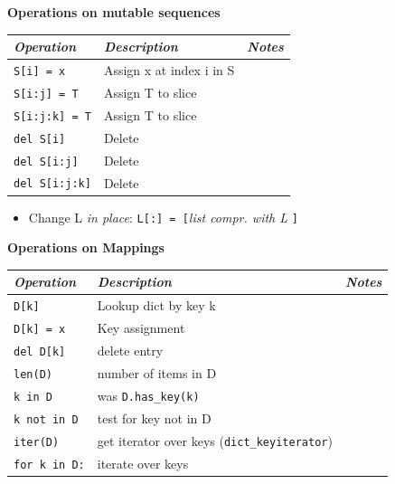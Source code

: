 \documentclass[9pt,a4wide]{extarticle}
\begin{document}
\bigskip
{\bf Operations on mutable sequences}

\begin{supertabular}{|l|p{12cm}|c|}\hline
{\em Operation }     &   {\em  Description}         & {\em  Notes} \\ \hline\hline

{\tt S[i] = x}       &   Assign x at index i in S   &        \\ \hline
{\tt S[i:j] = T}     &   Assign T to slice          &        \\ \hline
{\tt S[i:j:k] = T}   &   Assign T to slice          &        \\ \hline
{\tt del S[i]}       &   Delete                     &        \\ \hline
{\tt del S[i:j]}     &   Delete                     &        \\ \hline
{\tt del S[i:j:k]}   &   Delete                     &        \\ \hline
\end{supertabular}


\begin{itemize}
\item Change L {\em in place}: {\tt L[:] = [}{\em list compr. with L} {\tt ]}
\end{itemize}


\bigskip
{\bf Operations on Mappings}

\begin{supertabular}{|l|p{12cm}|c|}\hline
{\em Operation }     &   {\em  Description}         & {\em  Notes} \\ \hline\hline

{\tt D[k]}            &  Lookup dict by key k       &        \\ \hline
{\tt D[k] = x}        &  Key assignment             &        \\ \hline
{\tt del D[k]}        &  delete entry               &        \\ \hline
{\tt len(D)}          &  number of items in D       &        \\ \hline
{\tt k in D}          &  was {\tt D.has\_key(k)}    &        \\ \hline
{\tt k not in D}      &  test for key not in D      &        \\ \hline
{\tt iter(D)}         &  get iterator over keys ({\tt dict\_keyiterator})     &        \\ \hline
{\tt for k in D:}     &  iterate over keys          &        \\ \hline
\end{supertabular}
\end{document}
